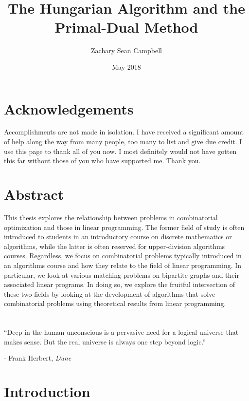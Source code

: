 \documentclass[12pt,twoside]{reedthesis}
\title{The Hungarian Algorithm and the Primal-Dual Method}
\author{Zachary Sean Campbell}
\date{May 2018}
\renewcommand{\'}{^{'}}
\theoremstyle{plain}
\theoremstyle{definition}
\begin{document}
    \maketitle
    \frontmatter %
    \pagestyle{empty} %

\chapter*{Acknowledgements}
Accomplishments are not made in isolation. I have received a significant amount of help along the way 
from many people, too many to list and give due credit. I use this page to thank all of you now. 
I most definitely would not have gotten this far without those of you who have supported me. Thank you.

\tableofcontents
\chapter*{Abstract}
This thesis explores the relationship between problems in combinatorial optimization 
and those in linear programming. The former field of study is often introduced to students in an 
introductory course on discrete mathematics or algorithms, while the latter is often reserved for 
upper-division algorithms courses. 
Regardless, we focus on combinatorial problems typically introduced in an algorithms course and how 
they relate to the field of linear programming. In particular, we look at various matching problems 
on bipartite graphs and their associated linear programs. In doing so, we explore the fruitful 
intersection of these two fields by looking at the development of algorithms that solve combinatorial 
problems using theoretical results from linear programming.

\chapter*{}
``Deep in the human unconscious is a pervasive need for a logical universe that makes sense. But the 
real universe is always one step beyond logic.''

- Frank Herbert, \emph{Dune}
\mainmatter %
\pagestyle{fancyplain} %

\chapter*{Introduction}
\end{document}
